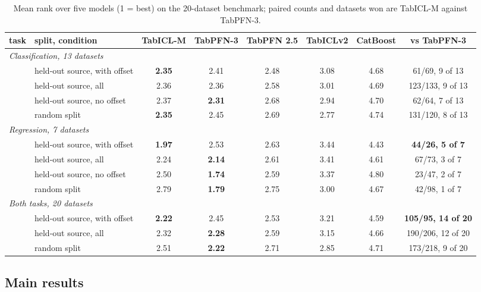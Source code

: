 \documentclass[11pt]{article}
\begin{document}
\begin{table}[!htbp]
\centering\small
\caption{Mean rank over five models (1 = best) on the 20-dataset benchmark; paired
counts and datasets won are TabICL-M against TabPFN-3.}
\label{tab:main}
\begin{tabular}{llccccc|c}
\toprule
task & split, condition & \textbf{TabICL-M} & TabPFN-3 & TabPFN 2.5 & TabICLv2 & CatBoost & vs TabPFN-3\\
\midrule
\multicolumn{8}{l}{\emph{Classification, 13 datasets}}\\
& held-out source, with offset & \textbf{2.35} & 2.41 & 2.48 & 3.08 & 4.68 & 61/69, 9 of 13\\
& held-out source, all & 2.36 & 2.36 & 2.58 & 3.01 & 4.69 & 123/133, 9 of 13\\
& held-out source, no offset & 2.37 & \textbf{2.31} & 2.68 & 2.94 & 4.70 & 62/64, 7 of 13\\
& random split & \textbf{2.35} & 2.45 & 2.69 & 2.77 & 4.74 & 131/120, 8 of 13\\
\midrule
\multicolumn{8}{l}{\emph{Regression, 7 datasets}}\\
& held-out source, with offset & \textbf{1.97} & 2.53 & 2.63 & 3.44 & 4.43 & \textbf{44/26, 5 of 7}\\
& held-out source, all & 2.24 & \textbf{2.14} & 2.61 & 3.41 & 4.61 & 67/73, 3 of 7\\
& held-out source, no offset & 2.50 & \textbf{1.74} & 2.59 & 3.37 & 4.80 & 23/47, 2 of 7\\
& random split & 2.79 & \textbf{1.79} & 2.75 & 3.00 & 4.67 & 42/98, 1 of 7\\
\midrule
\multicolumn{8}{l}{\emph{Both tasks, 20 datasets}}\\
& held-out source, with offset & \textbf{2.22} & 2.45 & 2.53 & 3.21 & 4.59 & \textbf{105/95, 14 of 20}\\
& held-out source, all & 2.32 & \textbf{2.28} & 2.59 & 3.15 & 4.66 & 190/206, 12 of 20\\
& random split & 2.51 & \textbf{2.22} & 2.71 & 2.85 & 4.71 & 173/218, 9 of 20\\
\bottomrule
\end{tabular}
\end{table}

\subsection{Main results}
\end{document}
